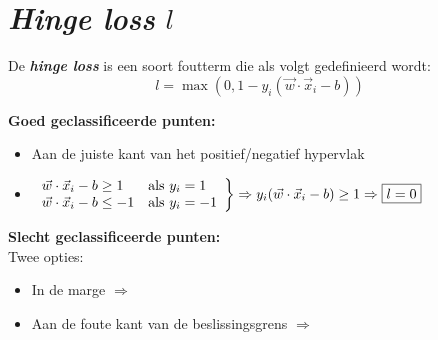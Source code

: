 \documentclass[kulak]{kulakposter}
\renewcommand{\boxed}[1]{\text{\fboxsep=.3em\fbox{#1}}}
\begin{document}
	\section{\textit{Hinge loss} \(l\)}
	
	De \textbf{\textit{hinge loss}} is een soort foutterm die als volgt gedefinieerd wordt:
	\[l=\max{(0,1-y_i(\vec{w}\cdot\vec{x}_i-b))}\]
	
	\vspace{0.5cm}
	
	\begin{multicols}{2}
		\textbf{Goed geclassificeerde punten:}
		\begin{itemize}
			\item Aan de juiste kant van het positief/negatief hypervlak
			\item 	\(\left. \begin{array}{ll}
				\vec{w}\cdot \vec{x}_i-b\geq 1 & \text{als } y_i=1 \\
				\vec{w}\cdot \vec{x}_i-b\leq -1 & \text{als } y_i=-1
			\end{array} \right\} \Rightarrow y_i(\vec{w}\cdot \vec{x}_i-b)\geq 1 \Rightarrow \boxed{$l=0$} \)
		\end{itemize}
		
		\columnbreak
		\textbf{Slecht geclassificeerde punten:}\\
		Twee opties:
		\begin{itemize}
			\item In de marge \(\Rightarrow\) \boxed{$0<l\leq 1$}
			\item Aan de foute kant van de beslissingsgrens \(\Rightarrow\) \boxed{$l > 1$}
		\end{itemize}
	\end{multicols}

	
	
\end{document}
